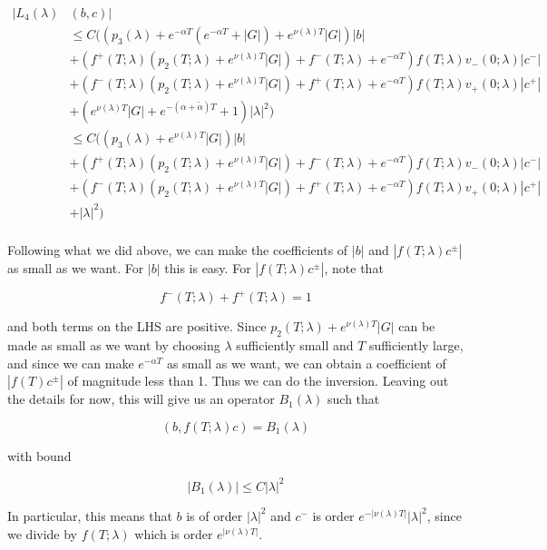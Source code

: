 \documentclass[12pt]{article}
\begin{document}
\begin{enumerate}
\begin{align*}
|L_4(\lambda)&(b, c)| \\
&\leq C\Big(( p_3(\lambda) + e^{-\alpha T}( e^{-\alpha T} + |G|) +  e^{\nu(\lambda)T}|G|)|b| \\ 
&+ (f^+(T; \lambda) (p_2(T; \lambda) + e^{\nu(\lambda)T}|G|) + f^-(T; \lambda) + e^{-\alpha T} ) f(T; \lambda) v_-(0; \lambda) |c^-| \\
&+ (f^-(T; \lambda) (p_2(T; \lambda) + e^{\nu(\lambda)T}|G|) + f^+(T; \lambda) + e^{-\alpha T} ) f(T; \lambda) v_+(0; \lambda) |c^+| \\
&+ ( e^{\nu(\lambda)T}|G| + e^{-(\alpha + \tilde{\alpha}) T} + 1) |\lambda|^2 \Big) \\
&\leq C\Big(( p_3(\lambda) +  e^{\nu(\lambda)T}|G|)|b| \\ 
&+ (f^+(T; \lambda) (p_2(T; \lambda) + e^{\nu(\lambda)T}|G|) + f^-(T; \lambda) + e^{-\alpha T} ) f(T; \lambda) v_-(0; \lambda) |c^-| \\
&+ (f^-(T; \lambda) (p_2(T; \lambda) + e^{\nu(\lambda)T}|G|) + f^+(T; \lambda) + e^{-\alpha T} ) f(T; \lambda) v_+(0; \lambda) |c^+| \\
&+ |\lambda|^2 \Big) \\
\end{align*}


Following what we did above, we can make the coefficients of $|b|$ and $|f(T; \lambda) c^\pm|$ as small as we want. For $|b|$ this is easy. For $|f(T; \lambda) c^\pm|$, note that 

\[
f^-(T; \lambda) + f^+(T; \lambda) = 1
\]

and both terms on the LHS are positive. Since $p_2(T; \lambda) + e^{\nu(\lambda)T}|G|$ can be made as small as we want by choosing $\lambda$ sufficiently small and $T$ sufficiently large, and since we can make $e^{-\alpha T}$ as small as we want, we can obtain a coefficient of $|f(T)c^\pm|$ of magnitude less than 1. Thus we can do the inversion. Leaving out the details for now, this will give us an operator $B_1(\lambda)$ such that

\[
(b, f(T; \lambda) c ) = B_1(\lambda)
\]

with bound

\[
|B_1(\lambda)| \leq C|\lambda|^2
\]

In particular, this means that $b$ is of order $|\lambda|^2$ and $c^-$ is order $e^{-|\nu(\lambda)T|} |\lambda|^2$, since we divide by $f(T; \lambda)$ which is order $e^{|\nu(\lambda)T|}$.\\


\end{enumerate}
\end{document}
